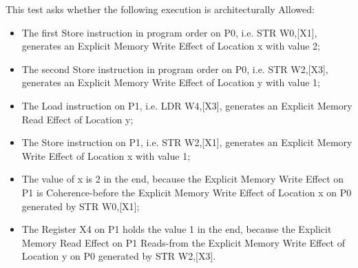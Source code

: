 This test asks whether the following execution is architecturally Allowed:

\begin{itemize}
  \item The first Store instruction in program order on P0, i.e. STR W0,[X1], generates an Explicit Memory Write Effect of Location x with value 2;
  \item The second Store instruction in program order on P0, i.e. STR W2,[X3], generates an Explicit Memory Write Effect of Location y with value 1;
  \item The Load instruction on P1, i.e. LDR W4,[X3], generates an Explicit Memory Read Effect of Location y;
  \item The Store instruction on P1, i.e. STR W2,[X1], generates an Explicit Memory Write Effect of Location x with value 1;
  \item The value of x is 2 in the end, because the Explicit Memory Write Effect on P1 is Coherence-before the Explicit Memory Write Effect of Location x on P0 generated by STR W0,[X1];
  \item The Register X4 on P1 holds the value 1 in the end, because the Explicit Memory Read Effect on P1 Reads-from the Explicit Memory Write Effect of Location y on P0 generated by STR W2,[X3].
\end{itemize}
